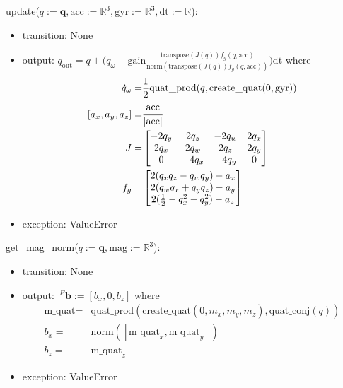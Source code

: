 \documentclass[12pt, titlepage]{article}
\begin{document}
\noindent update($q:=\mathbf{q}, \text{acc}:=\mathbb{R}^3, \text{gyr}:=\mathbb{R}^3, \text{dt}:=\mathbb{R}$):
\begin{itemize}
\item transition: None
\item output: $q_\text{out} = q + \Big( \dot{q}_{\omega} - \text{gain}\frac{\text{transpose}(J(q))f_g( q, \text{acc})}{\text{norm}(\text{transpose}(J(q))f_g( q, \text{acc}))}\Big) \text{dt}$ where
\begin{align*}
  \dot{q}_{\omega} =& \frac{1}{2} \text{quat\_prod}(q, \text{create\_quat}(0, \text{gyr})) \\
  [a_x, a_y, a_z] =& \cfrac{\text{acc}}{|\text{acc}|} \\
  J =& \begin{bmatrix}
    -2q_y & 2q_z & -2q_w & 2q_x \\
    2q_x & 2q_w & 2q_z & 2q_y \\
    0 & -4q_x & -4q_y & 0
    \end{bmatrix}\\
  f_{g} =& \begin{bmatrix}
    2(q_xq_z-q_wq_y)-a_x \\ 2(q_wq_x+q_yq_z)-a_y \\ 2(\frac{1}{2}-q_x^2-q_y^2)-a_z
  \end{bmatrix}
\end{align*}
\item exception: ValueError
\end{itemize}

\noindent get\_mag\_norm($q:=\mathbf{q}, \text{mag}:=\mathbb{R}^3$):
\begin{itemize}
\item transition: None
\item output: $\,^E\mathbf{b}:= [b_x, 0, b_z]$ where
\begin{align*}
  \text{m\_quat} =& \text{quat\_prod}(\text{create\_quat}(0, m_x, m_y, m_z), \text{quat\_conj}(q)) \\
  b_x =& \text{norm}([\text{m\_quat}_x, \text{m\_quat}_y]) \\
  b_z =& \text{m\_quat}_z
\end{align*}
\item exception: ValueError
\end{itemize}



\newpage

\end{document}
